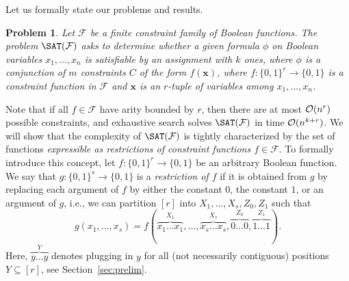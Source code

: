 \documentclass[10pt,a4paper]{article}
\theoremstyle{plain}
\newtheorem{problem}[thm]{Problem}
\newcommand{\Oh}{{\cal O}}
\newcommand{\confam}{\mathcal{F}}
\newcommand{\entry}[1]{#1 \dots #1}
\begin{document}
\setcounter{section}{1}
\setcounter{thm}{0}
Let us formally state our problems and results.
%
\begin{problem}
Let $\confam$ be a finite \emph{constraint family} of Boolean functions. The problem $\SAT(\confam)$ asks to determine whether a given formula $\phi$ on Boolean variables $x_1,\dots,x_n$ is satisfiable by an assignment with $k$ ones, where $\phi$ is a conjunction of $m$ constraints $C$ of the form $f(\mathbf{x})$, where $f:\{0,1\}^r \to \{0,1\}$ is a constraint function in $\confam$ and $\mathbf{x}$ is an $r$-tuple of variables among $x_1,\dots, x_n$.
\end{problem}
%
Note that if all $f\in \confam$ have arity bounded by $r$, then there are at most $\Oh(n^r)$ possible constraints, and exhaustive search solves $\SAT(\confam)$ in time $\Oh(n^{k+r})$.
%
We will show that the complexity of $\SAT(\confam)$ is tightly characterized by the set of functions \emph{expressible as restrictions of constraint functions $f\in \confam$}. To formally introduce this concept, let $f: \{0,1\}^r \to \{0,1\}$ be an arbitrary Boolean function. We say that $g:\{0,1\}^s\to \{0,1\}$ is a \emph{restriction of $f$} if it is obtained from $g$ by replacing each argument of $f$ by either the constant $0$, the constant $1$, or an argument of $g$, i.e., we can partition $[r]$ into $X_1,\dots, X_s, Z_0, Z_1$ such that 
\[ g(x_1,\dots,x_s) = f(\overbrace{\entry{x_1}}^{X_1}, \dots, \overbrace{\entry{x_s}}^{X_s}, \overbrace{\entry{0}}^{Z_0}, \overbrace{\entry{1}}^{Z_1}).\]
Here, $\overbrace{\entry{y}}^Y$ denotes plugging in $y$ for all (not necessarily contiguous) positions $Y\subseteq [r]$, see Section~\ref{sec:prelim}. 
%
   
\end{document}
